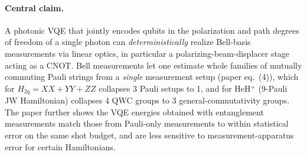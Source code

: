 \documentclass[11pt]{article}
\begin{document}
\paragraph{Central claim.} A photonic VQE that jointly encodes qubits in the
polarization and path degrees of freedom of a single photon can
\emph{deterministically} realize Bell-basis measurements via linear optics,
in particular a polarizing-beam-displacer stage acting as a CNOT. Bell
measurements let one estimate whole families of mutually commuting Pauli
strings from a \emph{single} measurement setup (paper eq.~(4)), which for
$H_{2q}=XX+YY+ZZ$ collapses 3 Pauli setups to 1, and for HeH$^+$ (9-Pauli JW
Hamiltonian) collapses 4 QWC groups to 3 general-commutativity groups.
The paper further shows the VQE energies obtained with entanglement
measurements match those from Pauli-only measurements to within
statistical error on the same shot budget, and are less sensitive to
measurement-apparatus error for certain Hamiltonians.
\end{document}
